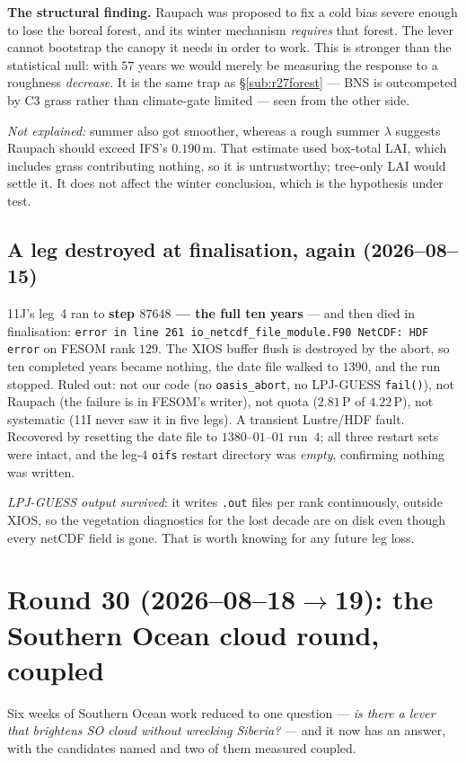 \documentclass[10pt]{article}
\begin{document}
\textbf{The structural finding.} Raupach was proposed to fix a cold bias severe enough to
lose the boreal forest, and its winter mechanism \emph{requires} that forest. The lever
cannot bootstrap the canopy it needs in order to work. This is stronger than the
statistical null: with $57$ years we would merely be measuring the response to a roughness
\emph{decrease}. It is the same trap as \S\ref{sub:r27forest} --- BNS is outcompeted by C3
grass rather than climate-gate limited --- seen from the other side.

\emph{Not explained:} summer also got smoother, whereas a rough summer $\lambda$ suggests
Raupach should exceed IFS's $0.190$\,m. That estimate used box-total LAI, which includes
grass contributing nothing, so it is untrustworthy; tree-only LAI would settle it. It does
not affect the winter conclusion, which is the hypothesis under test.

\subsection{A leg destroyed at finalisation, again (2026--08--15)}\label{sub:r29hdf}
11J's leg~4 ran to \textbf{step $87648$ --- the full ten years} --- and then died in
finalisation: \texttt{error in line 261 io\_netcdf\_file\_module.F90 NetCDF: HDF error} on
FESOM rank $129$. The XIOS buffer flush is destroyed by the abort, so ten completed years
became nothing, the date file walked to $1390$, and the run stopped. Ruled out: not our
code (no \texttt{oasis\_abort}, no LPJ-GUESS \texttt{fail()}), not Raupach (the failure is
in FESOM's writer), not quota ($2.81$\,P of $4.22$\,P), not systematic (11I never saw it in
five legs). A transient Lustre/HDF fault. Recovered by resetting the date file to
$1380$--$01$--$01$ run~$4$; all three restart sets were intact, and the leg-4
\texttt{oifs} restart directory was \emph{empty}, confirming nothing was written.

\emph{LPJ-GUESS output survived}: it writes \texttt{.out} files per rank continuously,
outside XIOS, so the vegetation diagnostics for the lost decade are on disk even though
every netCDF field is gone. That is worth knowing for any future leg loss.

\section{Round 30 (2026--08--18$\to$19): the Southern Ocean cloud round, coupled}\label{sec:round30}

Six weeks of Southern Ocean work reduced to one question --- \emph{is there a lever that
brightens SO cloud without wrecking Siberia?} --- and it now has an answer, with the
candidates named and two of them measured coupled.
\end{document}
